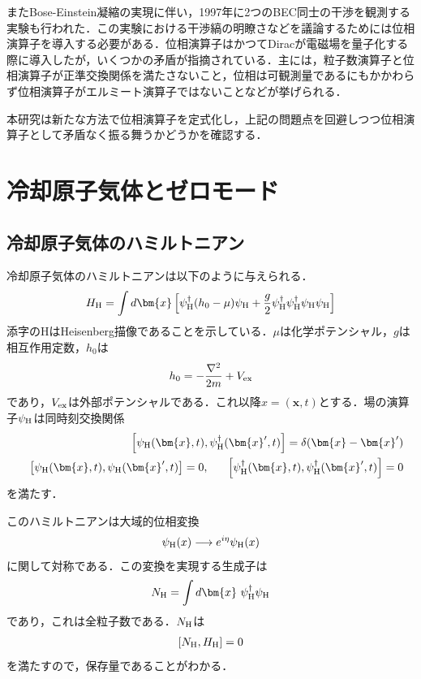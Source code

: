 \documentclass[10.5pt,a4paper]{jreport}
\begin{document}
またBose-Einstein凝縮の実現に伴い，1997年に2つのBEC同士の干渉を観測する実験も行われた\cite{andrews}．この実験における干渉縞の明瞭さなどを議論するためには位相演算子を導入する必要がある．位相演算子はかつてDiracが電磁場を量子化する際に導入したが\cite{dirac}，いくつかの矛盾が指摘されている．主には，粒子数演算子と位相演算子が正準交換関係を満たさないこと，位相は可観測量であるにもかかわらず位相演算子がエルミート演算子ではないことなどが挙げられる．

本研究は新たな方法で位相演算子を定式化し，上記の問題点を回避しつつ位相演算子として矛盾なく振る舞うかどうかを確認する．
\section{冷却原子気体とゼロモード}
\subsection{冷却原子気体のハミルトニアン}
冷却原子気体のハミルトニアンは以下のように与えられる．
\begin{eqnarray}
  H_{\rm H}=\int d\bm{x}\left[\psi_{\rm H}^\dagger(h_0-\mu)\psi_{\rm H} +\frac{g}{2}\psi_{\rm H}^\dagger\psi_{\rm H}^\dagger\psi_{\rm H}\psi_{\rm H}\right]
\end{eqnarray}
添字のHはHeisenberg描像であることを示している．$\mu$は化学ポテンシャル，$g$は相互作用定数，$h_0$は
\begin{eqnarray}
  h_0 = -\frac{\nabla^2}{2m} + V_{\rm ex}
\end{eqnarray}
であり，$V_{\rm ex}$は外部ポテンシャルである．これ以降$x=(\bm{x},t)$とする．場の演算子$\psi_{\rm H}$は同時刻交換関係
\begin{eqnarray}
  &&\left[\psi_{\rm H}(\bm{x},t),\psi_{\rm H}^\dagger(\bm{x}',t) \right] = \delta(\bm{x} - \bm{x}')\\
  &&\left[\psi_{\rm H}(\bm{x},t),\psi_{\rm H}(\bm{x}',t) \right] = 0,\ \ \ \ \ \left[\psi_{\rm H}^\dagger(\bm{x},t),\psi_{\rm H}^\dagger(\bm{x}',t) \right] = 0
\end{eqnarray}
を満たす．

このハミルトニアンは大域的位相変換
\begin{eqnarray}
  \psi_{\rm H}(x)\longrightarrow e^{i\eta}\psi_{\rm H}(x)
\end{eqnarray}
に関して対称である．この変換を実現する生成子は
\begin{eqnarray}
  N_{\rm H} = \int d\bm{x}\  \psi_{\rm H}^\dagger\psi_{\rm H}\label{all_particle}
\end{eqnarray}
であり，これは全粒子数である\cite{igi}．$N_{\rm H}$は
\begin{eqnarray}
  \left[N_{\rm H}, H_{\rm H}\right] = 0
\end{eqnarray}
を満たすので，保存量であることがわかる．
\end{document}
